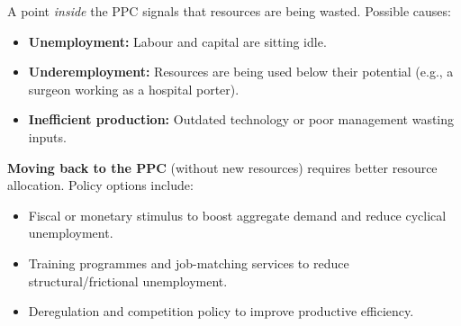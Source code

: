 \documentclass[11pt, a4paper, twoside]{book}
\begin{document}
A point \emph{inside} the PPC signals that resources are being wasted. Possible causes:

\begin{itemize}
  \item \textbf{Unemployment:} Labour and capital are sitting idle.
  \item \textbf{Underemployment:} Resources are being used below their potential (e.g., a surgeon working as a hospital porter).
  \item \textbf{Inefficient production:} Outdated technology or poor management wasting inputs.
\end{itemize}

\textbf{Moving back to the PPC} (without new resources) requires better resource allocation. Policy options include:
\begin{itemize}
  \item Fiscal or monetary stimulus to boost aggregate demand and reduce cyclical unemployment.
  \item Training programmes and job-matching services to reduce structural/frictional unemployment.
  \item Deregulation and competition policy to improve productive efficiency.
\end{itemize}
\end{document}
